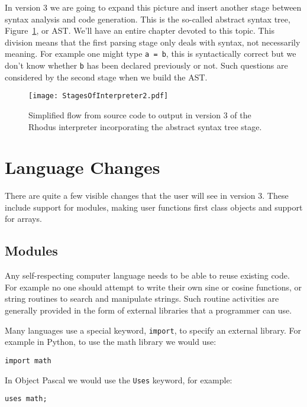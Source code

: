 In version 3 we are going to expand this picture and insert another stage between syntax analysis and code generation. This is the so-called abstract syntax tree, Figure~\ref{fig:simpleInterpreter2}, or AST. We'll have an entire chapter devoted to this topic. This division means that the first parsing stage only deals with syntax, not necessarily meaning. For example one might type {\tt a = b}, this is syntactically correct but we don't know whether {\tt b} has been declared previously or not. Such questions are considered by the second stage when we build the AST.

\begin{figure}[htpb]
\centering
\texttt{[image: StagesOfInterpreter2.pdf]}
\caption{Simplified flow from source code to output in version 3 of the Rhodus interpreter incorporating the abstract syntax tree stage.}
\label{fig:simpleInterpreter2}
\end{figure}

\section{Language Changes}

There are quite a few  visible changes that the user will see in version 3. These include support for modules, making user functions first class objects and support for arrays.

\subsection{Modules}

Any self-respecting computer language needs to be able to reuse existing code. For example no one should attempt to write their own sine or cosine functions, or string routines to search and manipulate strings. Such routine activities are generally provided in the form of external libraries that a programmer can use.

Many languages use a special keyword, {\tt import}, to specify an external library. For example in Python, to use the math library we would use:

\begin{lstlisting}
import math
\end{lstlisting}

In Object Pascal we would use the {\tt Uses} keyword, for example:

\begin{lstlisting}
uses math;
\end{lstlisting}

